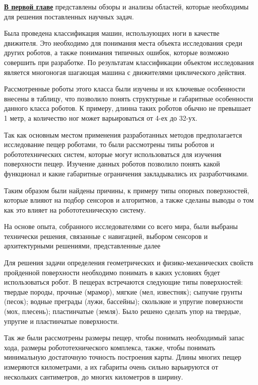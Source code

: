 
\textbf{\underline{В первой главе}} представлены обзоры и анализы областей, которые необходимы для решения поставленных научных задач.

Была проведена классификация машин, использующих ноги в качестве движителя. Это необходимо для понимания места объекта исследования среди других роботов, а также понимания типичных ошибок, которые возможно совершить при разработке. По результатам классификации объектом исследования является многоногая шагающая машина с движителями циклического действия.

Рассмотренные роботы этого класса были изучены и их ключевые особенности внесены в таблицу, что позволило понять структурные и габаритные особенности данного класса роботов. К примеру, длинна таких роботов обычно не превышает 1 метр, а количество ног может варьироваться от 4-ех до 32-ух.

Так как основным местом применения разработанных методов предполагается исследование пещер роботами, то были рассмотрены типы роботов и робототехнических систем, которые могут использоваться для изучения поверхности пещер. Изучение данных роботов позволило понять какой функционал и какие габаритные ограничения закладывались их разработчиками.

Таким образом были найдены причины, к примеру типы опорных поверхностей, которые влияют на подбор сенсоров и алгоритмов, а также сделаны выводы о том как это влияет на робототехническую систему. 

На основе опыта, собранного исследователями со всего мира, были выбраны технически решения, связанные с навигацией, выбором сенсоров и архитектурными решениями, представленные далее

Для решения задачи определения геометрических и физико-механических свойств пройденной поверхности необходимо понимать в каких условиях будет использоваться робот. В пещерах встречаются следующие типы поверхностей: твердые породы, прочные (мрамор), мягкие (мел, известняк); сыпучие грунты (песок); водные преграды (лужи, бассейны); скользкие и упругие поверхности (мох, плесень); пластинчатые (земля). Было решено сделать упор на твердые, упругие и пластинчатые поверхности.

Так же были рассмотрены размеры пещер, чтобы понимать необходимый запас хода, размеры робототехнического комплекса, также, чтобы понимать минимальную достаточную точность построения карты. Длины многих пещер измеряются километрами, а их габариты очень сильно варьируются от нескольких сантиметров, до многих километров в ширину.


